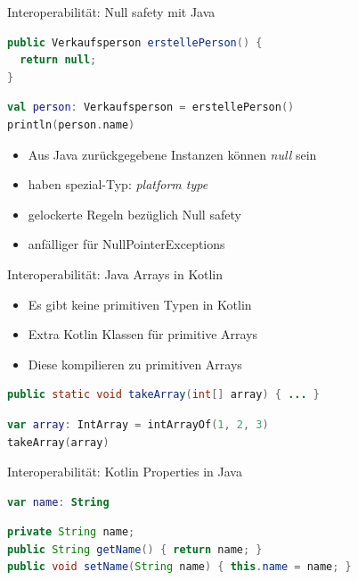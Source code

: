 \documentclass{beamer}
\begin{document}
\begin{frame}[fragile]{Interoperabilität: Null safety mit Java}
  \begin{lstlisting}[language=Java]
public Verkaufsperson erstellePerson() {
  return null;
}
  \end{lstlisting}
  \pause
  \begin{lstlisting}[language=Kotlin]
val person: Verkaufsperson = erstellePerson()
println(person.name)
  \end{lstlisting}
  \pause
  \begin{itemize}[<+->]
    \item Aus Java zurückgegebene Instanzen können \textit{null} sein
    \item haben spezial-Typ: \textit{platform type}
    \item gelockerte Regeln bezüglich Null safety
    \item anfälliger für NullPointerExceptions
  \end{itemize}
\end{frame}

\begin{frame}[fragile]{Interoperabilität: Java Arrays in Kotlin}
  \begin{itemize}[<+->]
    \item Es gibt keine primitiven Typen in Kotlin
    \item Extra Kotlin Klassen für primitive Arrays
    \item Diese kompilieren zu primitiven Arrays
  \end{itemize}
  \pause \vspace{1cm}
  \begin{lstlisting}[language=Java]
public static void takeArray(int[] array) { ... }
  \end{lstlisting}
  \pause
  \begin{lstlisting}[language=Kotlin]
var array: IntArray = intArrayOf(1, 2, 3)
takeArray(array)
  \end{lstlisting}
\end{frame}

\begin{frame}[fragile]{Interoperabilität: Kotlin Properties in Java}
  \begin{lstlisting}[language=Kotlin]
var name: String
    \end{lstlisting}
    \pause
    \begin{lstlisting}[language=Java]
private String name;
public String getName() { return name; }
public void setName(String name) { this.name = name; }
      \end{lstlisting}
\end{frame}
\end{document}
